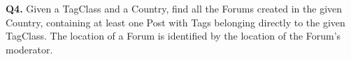 \textbf{Q4.}
Given a TagClass and a Country, find all the Forums created in the given
Country, containing at least one Post with Tags belonging directly to
the given TagClass.
The location of a Forum is identified by the location of the Forum's
moderator.
